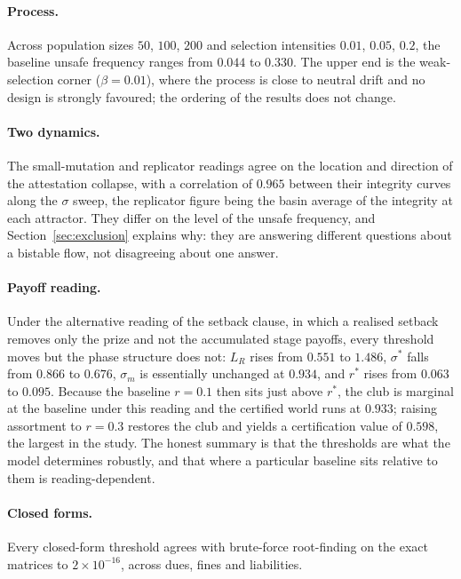 \documentclass[11pt,a4paper]{article}
\begin{document}
\paragraph{Process.} Across population sizes $50$, $100$, $200$ and selection
intensities $0.01$, $0.05$, $0.2$, the baseline unsafe frequency ranges from
$0.044$ to $0.330$. The upper end is the weak-selection corner
($\beta = 0.01$), where the process is close to neutral drift and no design is
strongly favoured; the ordering of the results does not change.

\paragraph{Two dynamics.} The small-mutation and replicator readings agree on
the location and direction of the attestation collapse, with a correlation of
$0.965$ between their integrity curves along the $\sigma$ sweep, the replicator
figure being the basin average of the integrity at each attractor. They differ
on the level of the unsafe frequency, and Section~\ref{sec:exclusion} explains
why: they are answering different questions about a bistable flow, not
disagreeing about one answer.

\paragraph{Payoff reading.} Under the alternative reading of the setback
clause, in which a realised setback removes only the prize and not the
accumulated stage payoffs, every threshold moves but the phase structure does
not: $L_R$ rises from $0.551$ to $1.486$, $\sigma^{*}$ falls from $0.866$ to
$0.676$, $\sigma_m$ is essentially unchanged at $0.934$, and $r^{*}$ rises from
$0.063$ to $0.095$. Because the baseline $r = 0.1$ then sits just above
$r^{*}$, the club is marginal at the baseline under this reading and the
certified world runs at $0.933$; raising assortment to $r = 0.3$ restores the
club and yields a certification value of $0.598$, the largest in the study. The
honest summary is that the thresholds are what the model determines robustly,
and that where a particular baseline sits relative to them is reading-dependent.

\paragraph{Closed forms.} Every closed-form threshold agrees with brute-force
root-finding on the exact matrices to $2 \times 10^{-16}$, across dues, fines
and liabilities.
\end{document}
